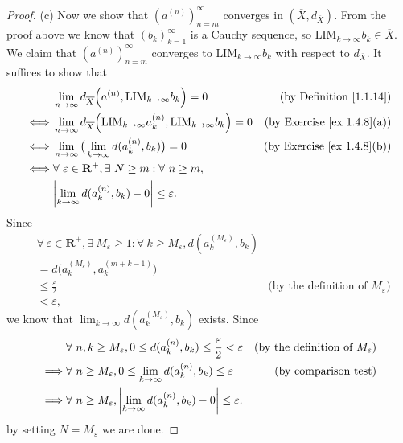 \begin{proof}{(c)}
    Now we show that \((a^{(n)})_{n = m}^\infty\) converges in \((\overline{X}, d_{\overline{X}})\).
    From the proof above we know that \((b_k)_{k = 1}^\infty\) is a Cauchy sequence, so \(\text{LIM}_{k \to \infty} b_k \in \overline{X}\).
    We claim that \((a^{(n)})_{n = m}^\infty\) converges to \(\text{LIM}_{k \to \infty} b_k\) with respect to \(d_{\overline{X}}\).
    It suffices to show that
    \begin{align*}
             & \lim_{n \to \infty} d_{\overline{X}}\Big(a^{(n)}, \text{LIM}_{k \to \infty} b_k\Big) = 0                             & \text{(by Definition \ref{1.1.14})}    \\
        \iff & \lim_{n \to \infty} d_{\overline{X}}\Big(\text{LIM}_{k \to \infty} a_k^{(n)}, \text{LIM}_{k \to \infty} b_k\Big) = 0 & \text{(by Exercise \ref{ex 1.4.8}(a))} \\
        \iff & \lim_{n \to \infty} \big(\lim_{k \to \infty} d(a_k^{(n)}, b_k)\big) = 0                                              & \text{(by Exercise \ref{ex 1.4.8}(b))} \\
        \iff & \forall\ \varepsilon \in \mathbf{R}^+, \exists\ N \geq m : \forall\ n \geq m,                                                                                 \\
             & \abs*{\lim_{k \to \infty} d(a_k^{(n)}, b_k) - 0} \leq \varepsilon.
    \end{align*}
    Since
    \begin{align*}
         & \forall\ \varepsilon \in \mathbf{R}^+, \exists\ M_\varepsilon \geq 1 : \forall\ k \geq M_\varepsilon, d(a_k^{(M_\varepsilon)}, b_k)                                                   \\
         & = d\Big(a_k^{(M_\varepsilon)}, a_k^{(m + k - 1)}\Big)                                                                                                                                 \\
         & \leq \frac{\varepsilon}{2}                                                                                                          & \text{(by the definition of \(M_\varepsilon\))} \\
         & < \varepsilon,
    \end{align*}
    we know that \(\lim_{k \to \infty} d(a_k^{(M_\varepsilon)}, b_k)\) exists.
    Since
    \begin{align*}
                 & \forall\ n, k \geq M_\varepsilon, 0 \leq d(a_k^{(n)}, b_k) \leq \frac{\varepsilon}{2} < \varepsilon & \text{(by the definition of \(M_\varepsilon\))} \\
        \implies & \forall\ n \geq M_\varepsilon, 0 \leq \lim_{k \to \infty} d(a_k^{(n)}, b_k) \leq \varepsilon        & \text{(by comparison test)}                     \\
        \implies & \forall\ n \geq M_\varepsilon, \abs*{\lim_{k \to \infty} d(a_k^{(n)}, b_k) - 0} \leq \varepsilon.
    \end{align*}
    by setting \(N = M_\varepsilon\) we are done.


\end{proof}
